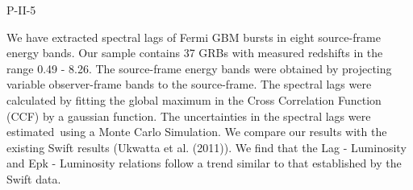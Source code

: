 P-II-5


\bigskip



\bigskip

\noindent We have extracted spectral lags of Fermi GBM bursts in eight source-frame energy bands. Our sample contains 37 GRBs with measured redshifts in the range 0.49 - 8.26. The source-frame energy bands were obtained by projecting variable observer-frame bands to the source-frame. The spectral lags were calculated by fitting the global maximum in the Cross Correlation Function (CCF) by a gaussian function. The uncertainties in the spectral lags were estimated using a Monte Carlo Simulation. We compare our results with the existing Swift results (Ukwatta et al. (2011)). We find that the Lag - Luminosity and Epk - Luminosity relations follow a trend similar to that established by the Swift data. 

